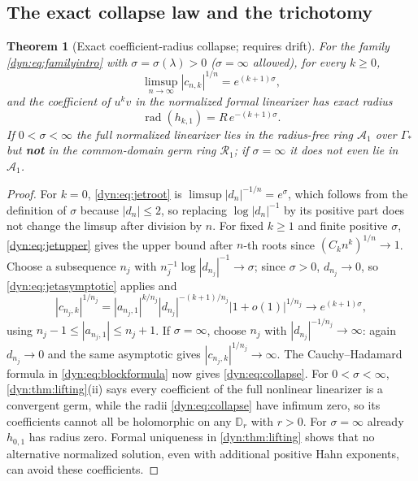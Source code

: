 \documentclass[11pt,letterpaper]{article}
\newtheorem{theorem}{Theorem}[section]
\theoremstyle{definition}
\theoremstyle{remark}
\newcommand{\rad}{\operatorname{rad}}
\numberwithin{equation}{section}
\begin{document}
\subsection{The exact collapse law and the trichotomy}

\begin{theorem}[Exact coefficient-radius collapse; requires drift]
\label{dyn:thm:collapse}
For the family \eqref{dyn:eq:familyintro} with $\sigma=\sigma(\lambda)>0$
($\sigma=\infty$ allowed), for every $k\ge0$,
\begin{equation}\label{dyn:eq:jetroot}
 \limsup_{n\to\infty}|c_{n,k}|^{1/n}=e^{(k+1)\sigma},
\end{equation}
and the coefficient of $u^{k}v$ in the normalized formal linearizer has
\emph{exact} radius
\begin{equation}\label{dyn:eq:collapse}
 \boxed{\;\rad(h_{k,1})=R\,e^{-(k+1)\sigma}.\;}
\end{equation}
If $0<\sigma<\infty$ the full normalized linearizer lies in the radius-free
ring $\mathcal A_1$ over $\Gamma_{*}$ but \textbf{not} in the
common-domain germ ring $\mathcal R_1$; if $\sigma=\infty$ it does not even
lie in $\mathcal A_1$.
\end{theorem}
\begin{proof}
For $k=0$, \eqref{dyn:eq:jetroot} is
$\limsup|d_n|^{-1/n}=e^{\sigma}$, which follows from the definition of
$\sigma$ because $|d_n|\le2$, so replacing $\log|d_n|^{-1}$ by its positive
part does not change the limsup after division by $n$. For fixed $k\ge1$
and finite positive $\sigma$, \eqref{dyn:eq:jetupper} gives the upper
bound after $n$-th roots since $(C_kn^{k})^{1/n}\to1$. Choose a
subsequence $n_j$ with $n_j^{-1}\log|d_{n_j}|^{-1}\to\sigma$; since
$\sigma>0$, $d_{n_j}\to0$, so \eqref{dyn:eq:jetasymptotic} applies and
\[
 |c_{n_j,k}|^{1/n_j}=|a_{n_j,1}|^{k/n_j}|d_{n_j}|^{-(k+1)/n_j}
 |1+o(1)|^{1/n_j}\longrightarrow e^{(k+1)\sigma},
\]
using $n_j-1\le|a_{n_j,1}|\le n_j+1$. If $\sigma=\infty$, choose $n_j$ with
$|d_{n_j}|^{-1/n_j}\to\infty$: again $d_{n_j}\to0$ and the same asymptotic
gives $|c_{n_j,k}|^{1/n_j}\to\infty$. The Cauchy--Hadamard formula in
\eqref{dyn:eq:blockformula} now gives \eqref{dyn:eq:collapse}. For
$0<\sigma<\infty$, \cref{dyn:thm:lifting}(ii) says every coefficient of the
full nonlinear linearizer is a convergent germ, while the radii
\eqref{dyn:eq:collapse} have infimum zero, so its coefficients cannot all
be holomorphic on any $\mathbb D_r$ with $r>0$. For $\sigma=\infty$ already
$h_{0,1}$ has radius zero. Formal uniqueness in \cref{dyn:thm:lifting}
shows that no alternative normalized solution, even with additional
positive Hahn exponents, can avoid these coefficients.
\end{proof}
\end{document}
